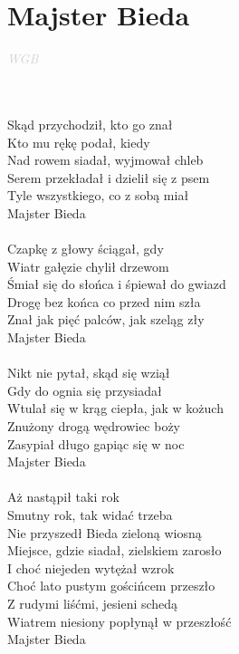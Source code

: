 \documentclass[a5paper, 10pt]{book}
\begin{document}
\newpage
\section{Majster Bieda}\textcolor{lightgray}{\textit{WGB}}\\~\\
\begin{minipage}[t]{0.7\textwidth}
  ~\\
  Skąd przychodził, kto go znał\\
  Kto mu rękę podał, kiedy\\
  Nad rowem siadał, wyjmował chleb\\
  Serem przekładał i dzielił się z psem\\
  Tyle wszystkiego, co z sobą miał\\
  Majster Bieda\\
  \\
  Czapkę z głowy ściągał, gdy\\
  Wiatr gałęzie chylił drzewom\\
  Śmiał się do słońca i śpiewał do gwiazd\\
  Drogę bez końca co przed nim szła\\
  Znał jak pięć palców, jak szeląg zły\\
  Majster Bieda\\
  \\
  Nikt nie pytał, skąd się wziął\\
  Gdy do ognia się przysiadał\\
  Wtulał się w krąg ciepła, jak w kożuch\\
  Znużony drogą wędrowiec boży\\
  Zasypiał długo gapiąc się w noc\\
  Majster Bieda\\
  \\
  Aż nastąpił taki rok\\
  Smutny rok, tak widać trzeba\\
  Nie przyszedł Bieda zieloną wiosną\\
  Miejsce, gdzie siadał, zielskiem zarosło\\
  I choć niejeden wytężał wzrok\\
  Choć lato pustym gościńcem przeszło\\
  Z rudymi liśćmi, jesieni schedą\\
  Wiatrem niesiony popłynął w przeszłość\\
  Majster Bieda\\
\end{minipage}
\end{document}
